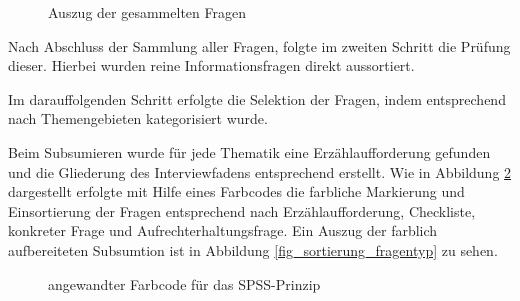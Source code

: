 \begin{figure}[h!]
	\centering
	\caption{Auszug der gesammelten Fragen}
	\label{fig_auszug_fragen_sammeln}
\end{figure}

Nach Abschluss der Sammlung aller Fragen, folgte im zweiten Schritt die Prüfung dieser. Hierbei wurden reine Informationsfragen direkt aussortiert. 

Im darauffolgenden Schritt erfolgte die Selektion der Fragen, indem entsprechend nach Themengebieten kategorisiert wurde. 

Beim Subsumieren wurde für jede Thematik eine Erzählaufforderung gefunden und die Gliederung des Interviewfadens entsprechend erstellt. Wie in Abbildung \ref{fig_farbcode_SPSS} dargestellt erfolgte mit Hilfe eines Farbcodes die farbliche Markierung und Einsortierung der Fragen entsprechend nach Erzählaufforderung, Checkliste, konkreter Frage und Aufrechterhaltungsfrage. Ein Auszug der farblich aufbereiteten Subsumtion ist in Abbildung \ref{fig_sortierung_fragentyp} zu sehen.

\begin{figure}[h!]
	\centering
	\caption{angewandter Farbcode für das SPSS-Prinzip}
	\label{fig_farbcode_SPSS}
\end{figure}


